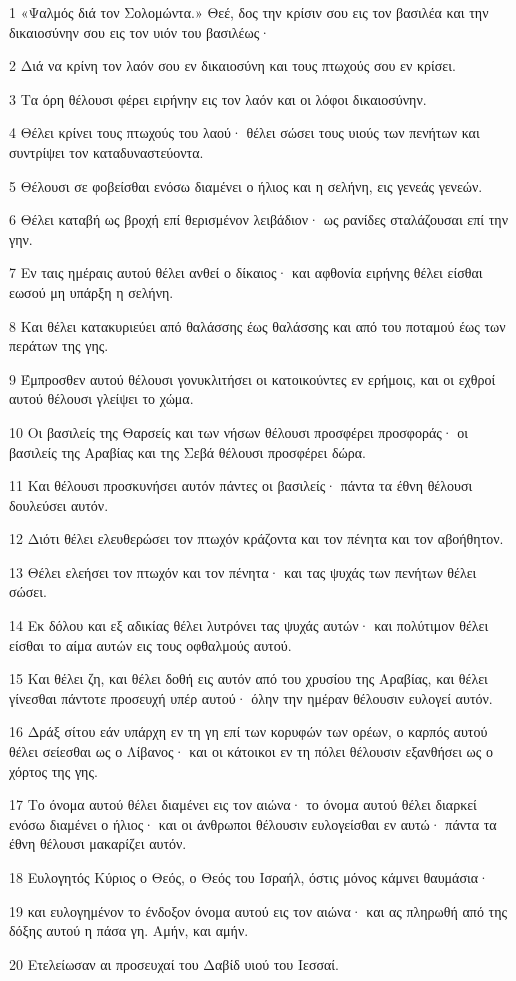 \par 1 «Ψαλμός διά τον Σολομώντα.» Θεέ, δος την κρίσιν σου εις τον βασιλέα και την δικαιοσύνην σου εις τον υιόν του βασιλέως·
\par 2 Διά να κρίνη τον λαόν σου εν δικαιοσύνη και τους πτωχούς σου εν κρίσει.
\par 3 Τα όρη θέλουσι φέρει ειρήνην εις τον λαόν και οι λόφοι δικαιοσύνην.
\par 4 Θέλει κρίνει τους πτωχούς του λαού· θέλει σώσει τους υιούς των πενήτων και συντρίψει τον καταδυναστεύοντα.
\par 5 Θέλουσι σε φοβείσθαι ενόσω διαμένει ο ήλιος και η σελήνη, εις γενεάς γενεών.
\par 6 Θέλει καταβή ως βροχή επί θερισμένον λειβάδιον· ως ρανίδες σταλάζουσαι επί την γην.
\par 7 Εν ταις ημέραις αυτού θέλει ανθεί ο δίκαιος· και αφθονία ειρήνης θέλει είσθαι εωσού μη υπάρξη η σελήνη.
\par 8 Και θέλει κατακυριεύει από θαλάσσης έως θαλάσσης και από του ποταμού έως των περάτων της γης.
\par 9 Έμπροσθεν αυτού θέλουσι γονυκλιτήσει οι κατοικούντες εν ερήμοις, και οι εχθροί αυτού θέλουσι γλείψει το χώμα.
\par 10 Οι βασιλείς της Θαρσείς και των νήσων θέλουσι προσφέρει προσφοράς· οι βασιλείς της Αραβίας και της Σεβά θέλουσι προσφέρει δώρα.
\par 11 Και θέλουσι προσκυνήσει αυτόν πάντες οι βασιλείς· πάντα τα έθνη θέλουσι δουλεύσει αυτόν.
\par 12 Διότι θέλει ελευθερώσει τον πτωχόν κράζοντα και τον πένητα και τον αβοήθητον.
\par 13 Θέλει ελεήσει τον πτωχόν και τον πένητα· και τας ψυχάς των πενήτων θέλει σώσει.
\par 14 Εκ δόλου και εξ αδικίας θέλει λυτρόνει τας ψυχάς αυτών· και πολύτιμον θέλει είσθαι το αίμα αυτών εις τους οφθαλμούς αυτού.
\par 15 Και θέλει ζη, και θέλει δοθή εις αυτόν από του χρυσίου της Αραβίας, και θέλει γίνεσθαι πάντοτε προσευχή υπέρ αυτού· όλην την ημέραν θέλουσιν ευλογεί αυτόν.
\par 16 Δράξ σίτου εάν υπάρχη εν τη γη επί των κορυφών των ορέων, ο καρπός αυτού θέλει σείεσθαι ως ο Λίβανος· και οι κάτοικοι εν τη πόλει θέλουσιν εξανθήσει ως ο χόρτος της γης.
\par 17 Το όνομα αυτού θέλει διαμένει εις τον αιώνα· το όνομα αυτού θέλει διαρκεί ενόσω διαμένει ο ήλιος· και οι άνθρωποι θέλουσιν ευλογείσθαι εν αυτώ· πάντα τα έθνη θέλουσι μακαρίζει αυτόν.
\par 18 Ευλογητός Κύριος ο Θεός, ο Θεός του Ισραήλ, όστις μόνος κάμνει θαυμάσια·
\par 19 και ευλογημένον το ένδοξον όνομα αυτού εις τον αιώνα· και ας πληρωθή από της δόξης αυτού η πάσα γη. Αμήν, και αμήν.
\par 20 Ετελείωσαν αι προσευχαί του Δαβίδ υιού του Ιεσσαί.

